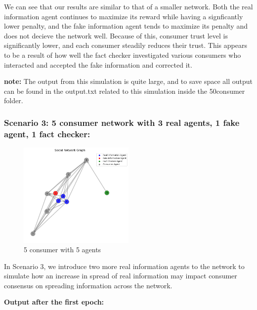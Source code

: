 \documentclass[twoside]{article}
\begin{document}
 We can see that our results are similar to that of a smaller network. Both the real information agent continues to maximize its reward while having a signficantly lower penalty, and the fake information agent tends to maximize its penalty and does not decieve the network well. Because of this, consumer trust level is significantly lower, and each consumer steadily reduces their trust. This appears to be a result of how well the fact checker investigated various consumers who interacted and accepted the fake information and corrected it.

 \textbf{note: } The output from this simulation is quite large, and to save space all output can be found in the output.txt related to this simulation inside the 50consumer folder.

 \pagebreak
 \subsubsection{Scenario 3: 5 consumer network with 3 real agents, 1 fake agent, 1 fact checker:}
 
 \begin{figure}[htbp]
     \centering
     \includegraphics[width=0.5\textwidth]{../results/multi_real_agent/initial.png}
     \caption{5 consumer with 5 agents}
     \label{fig: 5 consumer, 5 agents}
 \end{figure}

In Scenario 3, we introduce two more real information agents to the network to simulate how an increase in spread of real information may impact consumer consensus on spreading information across the network.

\textbf{Output after the first epoch: }
\end{document}

